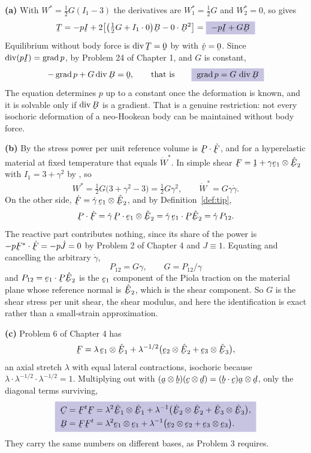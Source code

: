 \begin{solution}
\textbf{(a)} With $W^{*}=\tfrac12G(I_{1}-3)$ the derivatives are
$W^{*}_{1}=\tfrac12G$ and $W^{*}_{2}=0$, so  gives
\[
   \bT=-p\I+2\big[\big(\tfrac12G+I_{1}\cdot0\big)\bB
   -0\cdot\bB^{2}\big]=\boxed{\;-p\I+G\bB\;}
\]
Equilibrium without body force is $\dvg\bT=\bze$ by  with
$\dot\bv=\bze$. Since $\dvg(p\I)=\grad p$, by Problem 24 of Chapter 1,
and $G$ is constant,
\[
   -\grad p+G\dvg\bB=\bze,\qquad\text{that is}\qquad
   \boxed{\;\grad p=G\,\dvg\bB\;}
\]
The equation determines $p$ up to a constant once the deformation is
known, and it is solvable only if $\dvg\bB$ is a gradient. That is a
genuine restriction: not every isochoric deformation of a neo-Hookean
body can be maintained without body force.

\textbf{(b)} By  the stress power per unit reference volume
is $\bP\cdot\dot\bF$, and for a hyperelastic material at fixed
temperature that equals $\dot W^{*}$. In simple shear
$\bF=\shift+\gamma\be_{1}\otimes\hbE_{2}$ with $I_{1}=3+\gamma^{2}$ by
, so
\[
   W^{*}=\tfrac12G\big(3+\gamma^{2}-3\big)=\tfrac12G\gamma^{2},
   \qquad \dot W^{*}=G\gamma\dot\gamma .
\]
On the other side, $\dot\bF=\dot\gamma\,\be_{1}\otimes\hbE_{2}$, and by
Definition~\ref{def:tip},
\[
   \bP\cdot\dot\bF=\dot\gamma\,\bP\cdot\be_{1}\otimes\hbE_{2}
   =\dot\gamma\,\ip{\be_{1}}{\bP\hbE_{2}}=\dot\gamma\,P_{12}.
\]
The reactive part contributes nothing, since its share of the power is
$-p\bF^{*}\cdot\dot\bF=-p\dot J=0$ by Problem 2 of Chapter 4 and
$J\equiv1$. Equating and cancelling the arbitrary $\dot\gamma$,
\[
   \boxed{\;P_{12}=G\gamma,\qquad G=P_{12}/\gamma\;}
\]
and $P_{12}=\ip{\be_{1}}{\bP\hbE_{2}}$ is the $\be_{1}$ component of the
Piola traction on the material plane whose reference normal is
$\hbE_{2}$, which is the shear component. So $G$ is the shear stress per
unit shear, the shear modulus, and here the identification is exact
rather than a small-strain approximation.

\textbf{(c)} Problem 6 of Chapter 4 has
\[
   \bF=\lambda\,\be_{1}\otimes\hbE_{1}
   +\lambda^{-1/2}\big(\be_{2}\otimes\hbE_{2}+\be_{3}\otimes\hbE_{3}\big),
\]
an axial stretch $\lambda$ with equal lateral contractions, isochoric
because $\lambda\cdot\lambda^{-1/2}\cdot\lambda^{-1/2}=1$. Multiplying
out with $(\ba\otimes\bb)(\bc\otimes\bd)=(\ip\bb\bc)\ba\otimes\bd$, only
the diagonal terms surviving,
\[
   \boxed{\;
\begin{aligned}
   \bC&=\bF^{t}\bF=\lambda^{2}\hbE_{1}\otimes\hbE_{1}
   +\lambda^{-1}\big(\hbE_{2}\otimes\hbE_{2}
   +\hbE_{3}\otimes\hbE_{3}\big),\\
   \bB&=\bF\bF^{t}=\lambda^{2}\be_{1}\otimes\be_{1}
   +\lambda^{-1}\big(\be_{2}\otimes\be_{2}+\be_{3}\otimes\be_{3}\big).
\end{aligned}\;}
\]
They carry the same numbers on different bases, as Problem 3 requires.


\end{solution}
